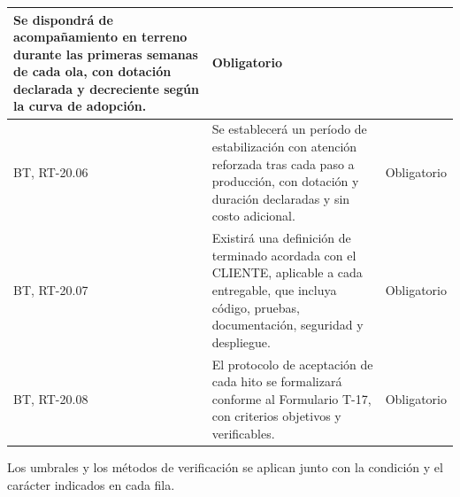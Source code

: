 \begin{longtable}{|L{0.098425\AnchoTablaAnexo}|L{0.814961\AnchoTablaAnexo}|L{0.086614\AnchoTablaAnexo}|}
Se dispondrá de acompañamiento en terreno durante las primeras semanas de cada ola, con dotación declarada y decreciente según la curva de adopción. &
Obligatorio \\ \hline
BT, RT-20.06 &
Se establecerá un período de estabilización con atención reforzada tras cada paso a producción, con dotación y duración declaradas y sin costo adicional. &
Obligatorio \\ \hline
{}
BT, RT-20.07 &
Existirá una definición de terminado acordada con el CLIENTE, aplicable a cada entregable, que incluya código, pruebas, documentación, seguridad y despliegue. &
Obligatorio \\ \hline
BT, RT-20.08 &
El protocolo de aceptación de cada hito se formalizará conforme al Formulario T-17, con criterios objetivos y verificables. &
Obligatorio \\ \hline
\end{longtable}

Los umbrales y los métodos de verificación se aplican junto con la condición y el carácter indicados en cada fila.
